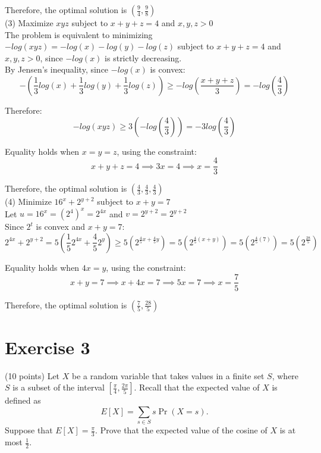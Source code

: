 \documentclass{article}
\begin{document}
Therefore, the optimal solution is $(\frac{9}{4}, \frac{9}{8})$ \\

(3) Maximize $xyz$ subject to $x + y + z = 4$ and $x,y,z > 0$ \\

The problem is equivalent to minimizing $-log(xyz) = -log(x) - log(y) - log(z)$ subject to $x + y + z = 4$ and $x,y,z > 0$, since $-log(x)$ is strictly decreasing. \\

By Jensen's inequality, since $-log(x)$ is convex:
\[
    -(\frac{1}{3}log(x) + \frac{1}{3}log(y) + \frac{1}{3}log(z)) \geq -log(\frac{x + y + z}{3}) = -log(\frac{4}{3})
\]

Therefore:
\[
    -log(xyz) \geq 3(-log(\frac{4}{3})) = -3log(\frac{4}{3})
\]

Equality holds when $x = y = z$, using the constraint:
\begin{equation*}
    x + y + z = 4 \implies 3x = 4 \implies x = \frac{4}{3}
\end{equation*}

Therefore, the optimal solution is $(\frac{4}{3}, \frac{4}{3}, \frac{4}{3})$ \\

(4) Minimize $16^x + 2^{y+2}$ subject to $x + y = 7$ \\

Let $u = 16^x = (2^4)^x = 2^{4x}$ and $v = 2^{y+2} = 2^{y+2}$ \\

Since $2^t$ is convex and $x + y = 7$:
\[
    2^{4x} + 2^{y+2} = 5(\frac{1}{5}2^{4x} + \frac{4}{5}2^{y}) \geq 5(2^{\frac{4}{5}x + \frac{4}{5}y}) = 5(2^{\frac{4}{5}(x + y)}) = 5(2^{\frac{4}{5}(7)}) = 5(2^{\frac{28}{5}})
\]

Equality holds when $4x = y$, using the constraint:
\[
    x + y = 7 \implies x + 4x = 7 \implies 5x = 7 \implies x = \frac{7}{5}
\]

Therefore, the optimal solution is $(\frac{7}{5}, \frac{28}{5})$

\newpage

\section*{Exercise 3}
(10 points) Let $X$ be a random variable that takes values in a finite set $S$, where $S$ is a subset of the interval $[\frac{\pi}{4}, \frac{2\pi}{5}]$. Recall that the expected value of $X$ is defined as
\[
    E[X] = \sum_{s\in S} s\Pr(X = s).
\]
Suppose that $E[X] = \frac{\pi}{3}$. Prove that the expected value of the cosine of $X$ is at most $\frac{1}{2}$.
\end{document}
